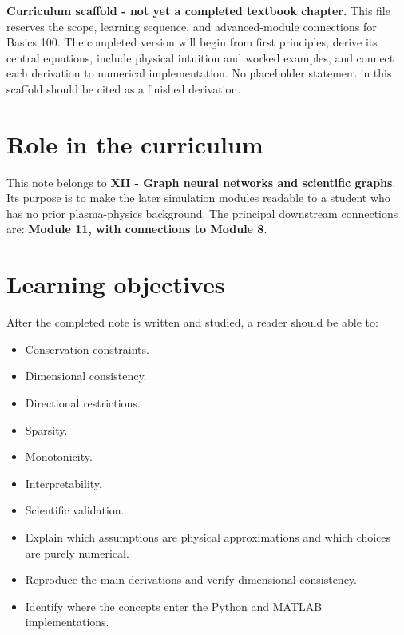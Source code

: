 \documentclass[11pt]{article}
\begin{document}

\begin{overviewbox}
\textbf{Curriculum scaffold - not yet a completed textbook chapter.} This file reserves the scope, learning sequence, and advanced-module connections for Basics 100. The completed version will begin from first principles, derive its central equations, include physical intuition and worked examples, and connect each derivation to numerical implementation. No placeholder statement in this scaffold should be cited as a finished derivation.
\end{overviewbox}

\ProjectTOC

\section{Role in the curriculum}
This note belongs to \textbf{XII - Graph neural networks and scientific graphs}. Its purpose is to make the later simulation modules readable to a student who has no prior plasma-physics background. The principal downstream connections are: \textbf{Module 11, with connections to Module 8}.

\section{Learning objectives}
After the completed note is written and studied, a reader should be able to:
\begin{itemize}[leftmargin=1.6em]
\item Conservation constraints.
\item Dimensional consistency.
\item Directional restrictions.
\item Sparsity.
\item Monotonicity.
\item Interpretability.
\item Scientific validation.
\item Explain which assumptions are physical approximations and which choices are purely numerical.
\item Reproduce the main derivations and verify dimensional consistency.
\item Identify where the concepts enter the Python and MATLAB implementations.
\end{itemize}
\end{document}
